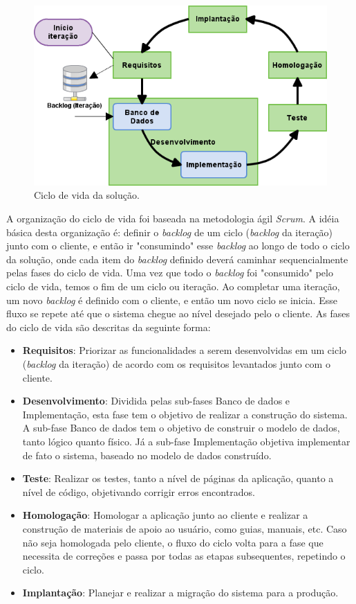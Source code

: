 \begin{figure}[!htb]
	\centering
		\includegraphics[scale=0.8]{figuras/ciclo_vida_solucao}
	\caption{Ciclo de vida da solução.}
\end{figure}

A organização do ciclo de vida foi baseada na metodologia ágil \textit{Scrum}. A idéia básica desta organização é: definir o \textit{backlog} de um ciclo (\textit{backlog} da iteração) junto com o cliente, e então ir "consumindo" esse \textit{backlog} ao longo de todo o ciclo da solução, onde cada item do \textit{backlog} definido deverá caminhar sequencialmente pelas fases do ciclo de vida. Uma vez que todo o \textit{backlog} foi "consumido" pelo ciclo de vida, temos o fim de um ciclo ou iteração. Ao completar uma iteração, um novo \textit{backlog} é definido com o cliente, e então um novo ciclo se inicia. Esse fluxo se repete até que o sistema chegue ao nível desejado pelo o cliente. As fases do ciclo de vida são descritas da seguinte forma:

\begin{itemize}
\item \textbf{Requisitos}: Priorizar as funcionalidades a serem desenvolvidas em um ciclo (\textit{backlog} da iteração) de acordo com os requisitos levantados junto com o cliente.
\item \textbf{Desenvolvimento}: Dividida pelas sub-fases Banco de dados e Implementação, esta fase tem o objetivo de realizar a construção do sistema. A sub-fase Banco de dados tem o objetivo de construir o modelo de dados, tanto lógico quanto físico. Já a sub-fase Implementação objetiva implementar de fato o sistema, baseado no modelo de dados construído.
\item \textbf{Teste}: Realizar os testes, tanto a nível de páginas da aplicação, quanto a nível de código, objetivando corrigir erros encontrados.
\item \textbf{Homologação}: Homologar a aplicação junto ao cliente e realizar a construção de materiais de apoio ao usuário, como guias, manuais, etc. Caso não seja homologada pelo cliente, o fluxo do ciclo volta para a fase que necessita de correções e passa por todas as etapas subsequentes, repetindo o ciclo.
\item \textbf{Implantação}: Planejar e realizar a migração do sistema para a produção.
\end{itemize}


